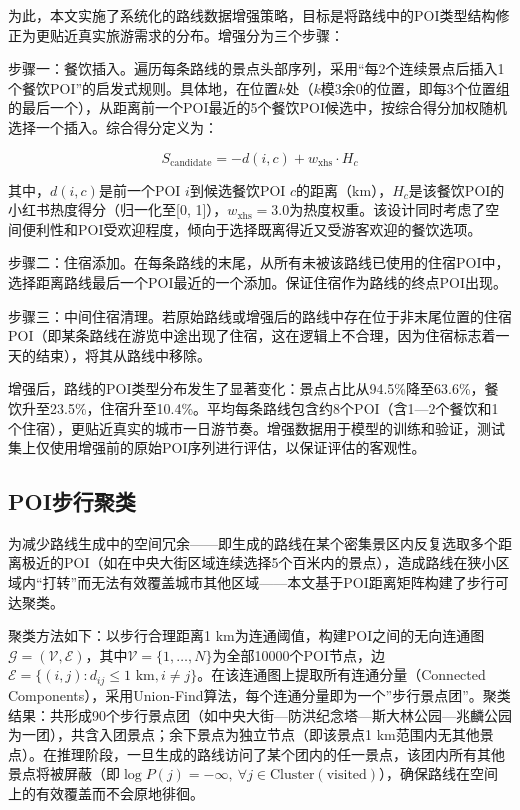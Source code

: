 \documentclass[12pt,a4paper]{ctexart}
\begin{document}
为此，本文实施了系统化的路线数据增强策略，目标是将路线中的POI类型结构修正为更贴近真实旅游需求的分布。增强分为三个步骤：

步骤一：餐饮插入。遍历每条路线的景点头部序列，采用“每2个连续景点后插入1个餐饮POI”的启发式规则。具体地，在位置$k$处（$k$模3余0的位置，即每3个位置组的最后一个），从距离前一个POI最近的5个餐饮POI候选中，按综合得分加权随机选择一个插入。综合得分定义为：

\begin{equation}
S_{\text{candidate}} = -d(i,c) + w_{\text{xhs}}\cdot H_c
\label{eq:candidate_score}
\end{equation}

其中，$d(i,c)$是前一个POI $i$到候选餐饮POI $c$的距离（km），$H_c$是该餐饮POI的小红书热度得分（归一化至[0, 1]），$w_{\text{xhs}}=3.0$为热度权重。该设计同时考虑了空间便利性和POI受欢迎程度，倾向于选择既离得近又受游客欢迎的餐饮选项。

步骤二：住宿添加。在每条路线的末尾，从所有未被该路线已使用的住宿POI中，选择距离路线最后一个POI最近的一个添加。保证住宿作为路线的终点POI出现。

步骤三：中间住宿清理。若原始路线或增强后的路线中存在位于非末尾位置的住宿POI（即某条路线在游览中途出现了住宿，这在逻辑上不合理，因为住宿标志着一天的结束），将其从路线中移除。

增强后，路线的POI类型分布发生了显著变化：景点占比从94.5\%降至63.6\%，餐饮升至23.5\%，住宿升至10.4\%。平均每条路线包含约8个POI（含1—2个餐饮和1个住宿），更贴近真实的城市一日游节奏。增强数据用于模型的训练和验证，测试集上仅使用增强前的原始POI序列进行评估，以保证评估的客观性。

\subsection{POI步行聚类}

为减少路线生成中的空间冗余——即生成的路线在某个密集景区内反复选取多个距离极近的POI（如在中央大街区域连续选择5个百米内的景点），造成路线在狭小区域内“打转”而无法有效覆盖城市其他区域——本文基于POI距离矩阵构建了步行可达聚类。

聚类方法如下：以步行合理距离1 km为连通阈值，构建POI之间的无向连通图$\mathcal{G}=(\mathcal{V},\mathcal{E})$，其中$\mathcal{V}=\{1,\dots,N\}$为全部10000个POI节点，边$\mathcal{E}=\{(i,j): d_{ij}\leq 1\text{ km}, i\neq j\}$。在该连通图上提取所有连通分量（Connected Components），采用Union-Find算法，每个连通分量即为一个”步行景点团”。聚类结果：共形成90个步行景点团（如中央大街—防洪纪念塔—斯大林公园—兆麟公园为一团），共含入团景点；余下景点为独立节点（即该景点1 km范围内无其他景点）。在推理阶段，一旦生成的路线访问了某个团内的任一景点，该团内所有其他景点将被屏蔽（即$\log P(j)=-\infty,\ \forall j\in\text{Cluster}(\text{visited})$），确保路线在空间上的有效覆盖而不会原地徘徊。
\end{document}

